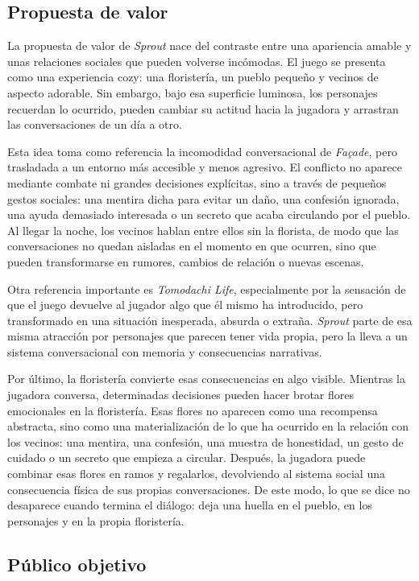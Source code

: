 \documentclass[12pt,twoside,titlepage]{report}
\begin{document}
\subsection{Propuesta de valor}

La propuesta de valor de \textit{Sprout} nace del contraste entre una apariencia amable y unas relaciones sociales que pueden volverse incómodas. El juego se presenta como una experiencia cozy: una floristería, un pueblo pequeño y vecinos de aspecto adorable. Sin embargo, bajo esa superficie luminosa, los personajes recuerdan lo ocurrido, pueden cambiar su actitud hacia la jugadora y arrastran las conversaciones de un día a otro.

Esta idea toma como referencia la incomodidad conversacional de \textit{Façade}, pero trasladada a un entorno más accesible y menos agresivo. El conflicto no aparece mediante combate ni grandes decisiones explícitas, sino a través de pequeños gestos sociales: una mentira dicha para evitar un daño, una confesión ignorada, una ayuda demasiado interesada o un secreto que acaba circulando por el pueblo. Al llegar la noche, los vecinos hablan entre ellos sin la florista, de modo que las conversaciones no quedan aisladas en el momento en que ocurren, sino que pueden transformarse en rumores, cambios de relación o nuevas escenas.

Otra referencia importante es \textit{Tomodachi Life}, especialmente por la sensación de que el juego devuelve al jugador algo que él mismo ha introducido, pero transformado en una situación inesperada, absurda o extraña. \textit{Sprout} parte de esa misma atracción por personajes que parecen tener vida propia, pero la lleva a un sistema conversacional con memoria y consecuencias narrativas.

Por último, la floristería convierte esas consecuencias en algo visible. Mientras la jugadora conversa, determinadas decisiones pueden hacer brotar flores emocionales en la floristería. Esas flores no aparecen como una recompensa abstracta, sino como una materialización de lo que ha ocurrido en la relación con los vecinos: una mentira, una confesión, una muestra de honestidad, un gesto de cuidado o un secreto que empieza a circular. Después, la jugadora puede combinar esas flores en ramos y regalarlos, devolviendo al sistema social una consecuencia física de sus propias conversaciones. De este modo, lo que se dice no desaparece cuando termina el diálogo: deja una huella en el pueblo, en los personajes y en la propia floristería.


\subsection{Público objetivo}
\end{document}
